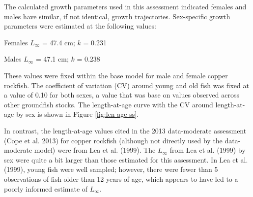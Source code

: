 \documentclass[11pt,
  english,
  a4paper,
]{article}
\begin{document}
\leavevmode\tagmcend\tagstructend\par


The calculated growth parameters used in this assessment indicated females and males have similar, if not identical, growth trajectories. Sex-specific growth parameters were estimated at the following values:

\leavevmode\tagmcend\tagstructend\par

\begin{centering}

Females $L_{\infty}$ = 47.4 cm; $k$ = 0.231

Males $L_{\infty}$ = 47.1 cm; $k$ = 0.238

\end{centering}

\vspace{0.75cm}


These values were fixed within the base model for male and female copper rockfish. The coefficient of variation (CV) around young and old fish was fixed at a value of 0.10 for both sexes, a value that was base on values observed across other groundfish stocks. The length-at-age curve with the CV around length-at-age by sex is shown in Figure \ref{fig:len-age-ss}.

\leavevmode\tagmcend\tagstructend\par


In contrast, the length-at-age values cited in the 2013 data-moderate assessment {(Cope et al. 2013)\leavevmode\tagmcend\tagstructend} for copper rockfish (although not directly used by the data-moderate model) were from Lea et al. {(1999)\leavevmode\tagmcend\tagstructend}. The {\(L_{\infty}\)\leavevmode\tagmcend\tagstructend} from Lea et al. {(1999)\leavevmode\tagmcend\tagstructend} by sex were quite a bit larger than those estimated for this assessment. In Lea et al. {(1999)\leavevmode\tagmcend\tagstructend}, young fish were well sampled; however, there were fewer than 5 observations of fish older than 12 years of age, which appears to have led to a poorly informed estimate of {\(L_{\infty}\)\leavevmode\tagmcend\tagstructend}.
\end{document}
